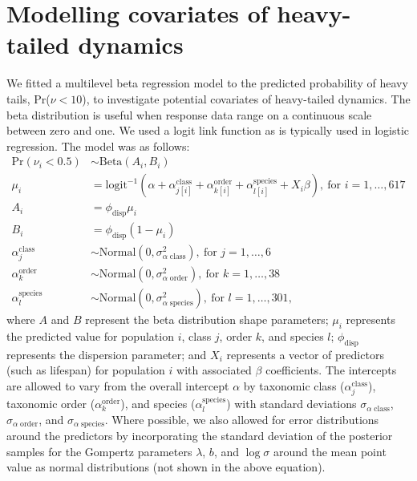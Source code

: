 \section{Modelling covariates of heavy-tailed dynamics}

We fitted a multilevel beta regression model to the predicted probability of heavy tails, Pr($\nu < 10$), to investigate potential covariates of heavy-tailed dynamics. The beta distribution is useful when response data range on a continuous scale between zero and one. We used a logit link function as is typically used in logistic regression. The model was as follows:
\begin{align*}
\mathrm{Pr}(\nu_i < 0.5) &\sim \mathrm{Beta}(A_i, B_i)\\
\mu_i &= \mathrm{logit}^{-1}(\alpha
  + \alpha^\mathrm{class}_{j[i]}
  + \alpha^\mathrm{order}_{k[i]}
  + \alpha^\mathrm{species}_{l[i]}
  + X_i \beta),
  \: \text{for } i = 1, \dots, 617\\
A_i &= \phi_\mathrm{disp} \mu_i\\
B_i &= \phi_\mathrm{disp} (1 - \mu_i)\\
\alpha^\mathrm{class}_j &\sim
  \mathrm{Normal}(0, \sigma^2_{\alpha \; \mathrm{class}}),
  \: \text{for } j = 1, \dots, 6\\
\alpha^\mathrm{order}_k &\sim
  \mathrm{Normal}(0, \sigma^2_{\alpha \; \mathrm{order}}),
  \: \text{for } k = 1, \dots, 38\\
\alpha^\mathrm{species}_l &\sim
  \mathrm{Normal}(0, \sigma^2_{\alpha \; \mathrm{species}}),
  \: \text{for } l = 1, \dots, 301,
\end{align*}
where $A$ and $B$ represent the beta distribution shape parameters; $\mu_i$ represents the predicted value for population $i$, class $j$, order $k$, and species $l$; $\phi_\mathrm{disp}$ represents the dispersion parameter; and $X_i$ represents a vector of predictors (such as lifespan) for population $i$ with associated $\beta$ coefficients. The intercepts are allowed to vary from the overall intercept $\alpha$ by taxonomic class ($\alpha^\mathrm{class}_j$), taxonomic order ($\alpha^\mathrm{order}_k$), and species ($\alpha^\mathrm{species}_l$) with standard deviations $\sigma_{\alpha \; \mathrm{class}}$, $\sigma_{\alpha \; \mathrm{order}}$, and $\sigma_{\alpha \; \mathrm{species}}$. Where possible, we also allowed for error distributions around the predictors by incorporating the standard deviation of the posterior samples for the Gompertz parameters $\lambda$, $b$, and $\log \sigma$ around the mean point value as normal distributions (not shown in the above equation).

